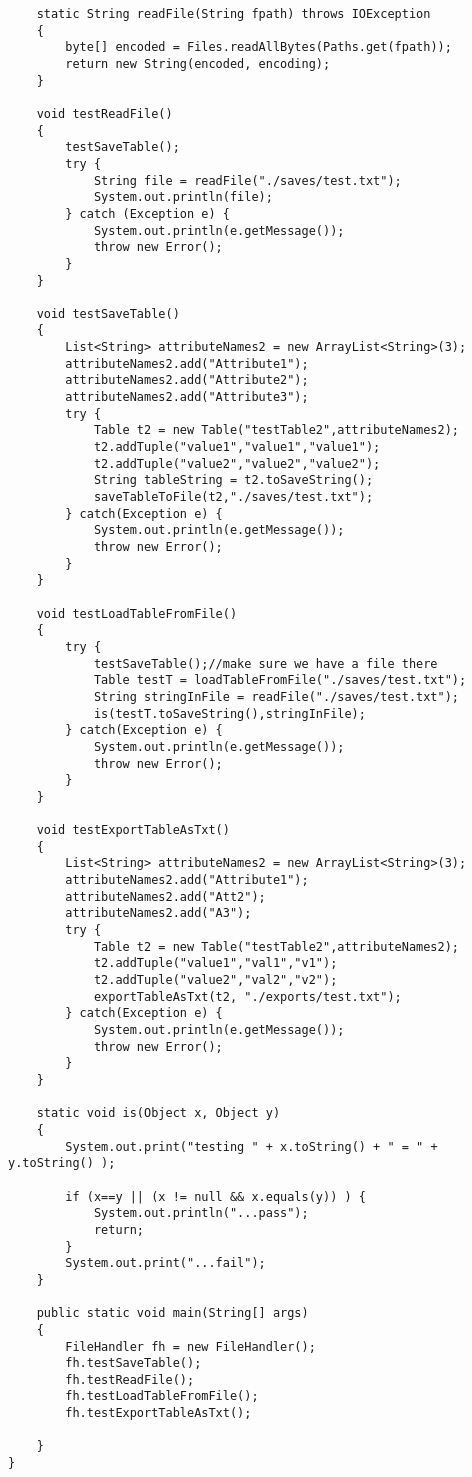 \documentclass[11pt]{article} %
\begin{document}
\begin{lstlisting}
    static String readFile(String fpath) throws IOException
    {
        byte[] encoded = Files.readAllBytes(Paths.get(fpath));
        return new String(encoded, encoding);
    }
    
    void testReadFile()
    {
        testSaveTable();
        try {
            String file = readFile("./saves/test.txt");
            System.out.println(file);
        } catch (Exception e) {
            System.out.println(e.getMessage());
            throw new Error();
        }
    }
    
    void testSaveTable()
    {
        List<String> attributeNames2 = new ArrayList<String>(3);
        attributeNames2.add("Attribute1");
        attributeNames2.add("Attribute2");
        attributeNames2.add("Attribute3");
        try {
            Table t2 = new Table("testTable2",attributeNames2);
            t2.addTuple("value1","value1","value1");
            t2.addTuple("value2","value2","value2");
            String tableString = t2.toSaveString();
            saveTableToFile(t2,"./saves/test.txt");
        } catch(Exception e) {
            System.out.println(e.getMessage());
            throw new Error();
        }
    }
    
    void testLoadTableFromFile()
    {
        try {
            testSaveTable();//make sure we have a file there
            Table testT = loadTableFromFile("./saves/test.txt");
            String stringInFile = readFile("./saves/test.txt");
            is(testT.toSaveString(),stringInFile);
        } catch(Exception e) {
            System.out.println(e.getMessage());
            throw new Error();
        }
    }

    void testExportTableAsTxt()
    {
        List<String> attributeNames2 = new ArrayList<String>(3);
        attributeNames2.add("Attribute1");
        attributeNames2.add("Att2");
        attributeNames2.add("A3");
        try {
            Table t2 = new Table("testTable2",attributeNames2);
            t2.addTuple("value1","val1","v1");
            t2.addTuple("value2","val2","v2");
            exportTableAsTxt(t2, "./exports/test.txt");
        } catch(Exception e) {
            System.out.println(e.getMessage());
            throw new Error();
        }
    }
    
    static void is(Object x, Object y)
    {
        System.out.print("testing " + x.toString() + " = " + y.toString() );
        
        if (x==y || (x != null && x.equals(y)) ) {
            System.out.println("...pass");
            return;
        }
        System.out.print("...fail");
    }
    
    public static void main(String[] args)
    {
        FileHandler fh = new FileHandler();
        fh.testSaveTable();
        fh.testReadFile();
        fh.testLoadTableFromFile();
        fh.testExportTableAsTxt();

    }
}
\end{lstlisting}
\end{document}
